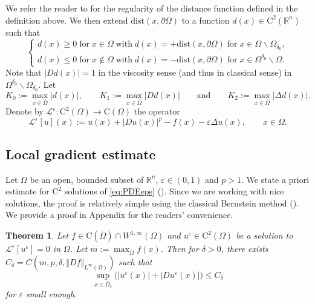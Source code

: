 \documentclass[12pt,reqno]{amsart}
\numberwithin{figure}{section}
\theoremstyle{plain}
\newtheorem{thm}{Theorem}[section]
\theoremstyle{remark}
\numberwithin{equation}{section}
\newcommand{\R}{\mathbb{R}}
\newcommand{\rmC}{\mathrm{C}}
\begin{document}
We refer the reader to \cite{gilbarg_elliptic_2001} for the regularity of the distance function defined in the definition above. We then extend $\mathrm{dist}(x,\partial\Omega)$ to a function $d(x)\in \mathrm{C}^2(\mathbb{R}^n)$ such that 
\begin{equation}\label{e:distance_def}
    \begin{cases}
    d(x)\geq 0\;\text{for}\;x\in\Omega\;\text{with}\;d(x) = +\mathrm{dist}(x,\partial\Omega)\;\text{for}\;x\in \Omega\backslash \Omega_{\delta_0},\\
    d(x)\leq 0\;\text{for}\;x\notin \Omega\;\text{with}\;d(x) = -\mathrm{dist}(x,\partial\Omega)\;\text{for}\;x\in \Omega^{\delta_0}\backslash \Omega.
    \end{cases}
\end{equation}
Note that $|D d(x)| = 1$ in the viscosity sense (and thus in classical sense) in $\Omega^{\delta_0}\backslash \Omega_{\delta_0}$. Let 
\begin{equation}\label{boundond}
   K_0:= \max_{x\in \overline{\Omega}}|d(x)|, \qquad K_1 := \max_{x\in \overline{\Omega}} |D d(x)| \qquad\text{and}\qquad K_2 := \max_{x\in \overline{\Omega}} |\Delta d(x)|.
\end{equation}
\noindent Denote by $\mathcal{L}^\varepsilon:\rmC^2(\Omega)\to \rmC(\Omega)$ the operator
\begin{equation*}
    \mathcal{L}^\varepsilon[u](x) :=   u(x) + |Du(x)|^p - f(x) - \varepsilon \Delta u(x), \qquad x\in \Omega.
\end{equation*}



\subsection{Local gradient estimate} Let $\Omega$ be an open, bounded subset of $\R^n$, $\varepsilon \in (0,1)$ and $p>1$. We state a priori estimate for $\rmC^2$ solutions of \eqref{eq:PDEeps} (\cite[Appendix]{Lasry1989}). Since we are working with nice solutions, the proof is relatively simple using the classical Bernstein method (\cite{bernstein_sur_1910}). We provide a proof in Appendix for the readers' convenience. 


\begin{thm}\label{thm:grad_1} Let $f\in \rmC(\overline{\Omega})\cap W^{1,\infty}(\Omega)$ and $u^\varepsilon \in \mathrm{C}^2(\Omega)$ be a solution to $\mathcal{L}^\varepsilon[u^\varepsilon] = 0$ in $\Omega$. Let $m:= \max_{\overline{\Omega}}f(x)$. Then for $\delta>0$, there exists $C_\delta = C(m,p,\delta, \Vert D f\Vert_{L^\infty(\Omega)})$ such that 
\begin{equation*}
    \sup_{x\in \overline{\Omega}_\delta} \Big(|u^\varepsilon(x)|+|Du^\varepsilon(x)|\Big) \leq C_\delta
\end{equation*}
for $\varepsilon$ small enough.
\end{thm}
\end{document}

